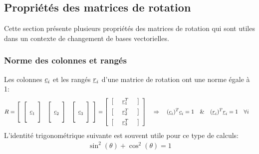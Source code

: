 \subsection{Propriétés des matrices de rotation}

Cette section présente plusieurs propriétés des matrices de rotation qui sont utiles dans un contexte de changement de bases vectorielles.

\subsubsection{Norme des colonnes et rangés}

Les colonnes $\underline{c}_i$ et les rangés $\underline{r}_i$ d'une matrice de rotation ont une norme égale à 1:
\begin{align}
R &= 
\left[ \begin{array}{c c c} 
	\left[ \begin{array}{c} \\ \underline{c}_1 \\  \\ \end{array}  \right] & \left[ \begin{array}{c} \\ \underline{c}_2 \\  \\ \end{array}  \right] & \left[ \begin{array}{c} \\ \underline{c}_3 \\  \\ \end{array}  \right]
\end{array} \right]
=
\left[ \begin{array}{c} 
\left[ \begin{array}{c c c} & \underline{r}_1^T & \end{array} \right] \\[\medskipamount]
\left[ \begin{array}{c c c} & \underline{r}_2^T & \end{array} \right] \\[\medskipamount]
\left[ \begin{array}{c c c} & \underline{r}_3^T & \end{array} \right] 
\end{array} \right] 
\quad \Rightarrow \quad
(\underline{c}_i)^T \underline{c}_i = 1 \quad \& \quad (\underline{r}_i)^T \underline{r}_i = 1  \quad \forall i 
\end{align}
L’identité trigonométrique suivante est souvent utile pour ce type de calculs:
\begin{align}
\sin^2(\theta) + \cos^2(\theta) = 1
\end{align}

